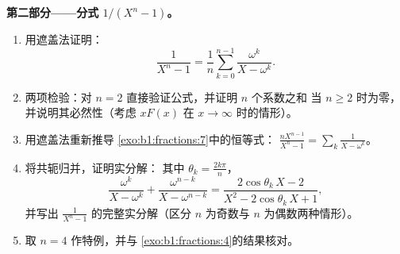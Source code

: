 \begin{problem}
\medskip
\noindent\textbf{第二部分——分式 $1/(X^n - 1)$。}
\begin{enumerate}[resume]
  \item 用遮盖法证明：
        \[
        \frac{1}{X^n - 1}
        = \frac1n\sum_{k=0}^{n-1}\frac{\omega^k}{X - \omega^k} .
        \]
  \item 两项检验：对 $n =
        2$ 直接验证公式，并证明 $n$ 个系数之和
        当 $n \geq 2$ 时为零，并说明其必然性（考虑
        $xF(x)$ 在 $x \to \infty$ 时的情形）。
  \item 用遮盖法重新推导
        \cref{exo:b1:fractions:7}中的恒等式：
        $\frac{nX^{n-1}}{X^n-1} = \sum_k \frac1{X - \omega^k}$。
  \item 将共轭归并，证明实分解：
        其中 $\theta_k = \frac{2k\pi}n$，
        \[
        \frac{\omega^k}{X - \omega^k} +
        \frac{\omega^{n-k}}{X - \omega^{n-k}}
        = \frac{2\cos\theta_k\,X - 2}
        {X^2 - 2\cos\theta_k\,X + 1} ,
        \]
        并写出
        $\frac1{X^n-1}$ 的完整实分解（区分 $n$ 为奇数与 $n$ 为偶数两种情形）。
  \item 取 $n = 4$ 作特例，并与
        \cref{exo:b1:fractions:4}的结果核对。
\end{enumerate}


\end{problem}
